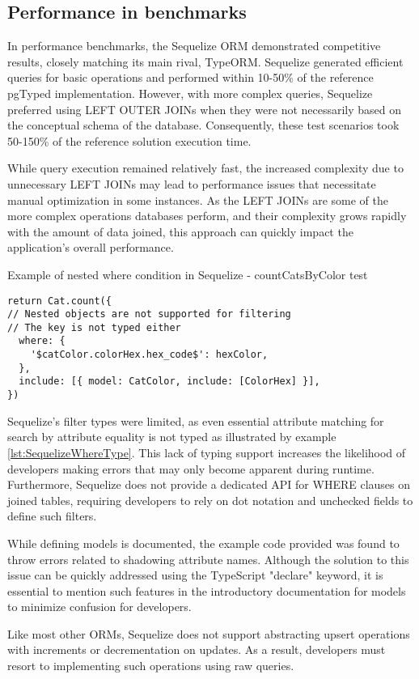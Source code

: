 \subsection*{Performance in benchmarks}

In performance benchmarks, the Sequelize ORM demonstrated competitive results,
closely matching its main rival, TypeORM. Sequelize generated efficient queries
for basic operations and performed within 10-50\% of the reference pgTyped
implementation. However, with more complex queries, Sequelize preferred using
LEFT OUTER JOINs when they were not necessarily based on the conceptual schema
of the database. Consequently, these test scenarios took 50-150\% of the
reference solution execution time.

While query execution remained relatively fast, the increased complexity due to
unnecessary LEFT JOINs may lead to performance issues that necessitate manual
optimization in some instances. As the LEFT JOINs are some of the more complex
operations databases perform, and their complexity grows rapidly with the amount
of data joined, this approach can quickly impact the application's overall
performance.

\begin{listing}
    \caption{Example of nested where condition in Sequelize - countCatsByColor test}
    \label{lst:SequelizeWhereType}
\begin{verbatim}
return Cat.count({
// Nested objects are not supported for filtering
// The key is not typed either
  where: {
    '$catColor.colorHex.hex_code$': hexColor,
  },
  include: [{ model: CatColor, include: [ColorHex] }],
})
    \end{verbatim}
\end{listing}

Sequelize's filter types were limited, as even essential attribute matching for
search by attribute equality is not typed as illustrated by example
\autoref{lst:SequelizeWhereType}. This lack of typing support increases the
likelihood of developers making errors that may only become apparent during
runtime. Furthermore, Sequelize does not provide a dedicated API for WHERE
clauses on joined tables, requiring developers to rely on dot notation and
unchecked fields to define such filters.

While defining models is documented, the example code provided was found to
throw errors related to shadowing attribute names. Although the solution to this
issue can be quickly addressed using the TypeScript "declare" keyword, it is
essential to mention such features in the introductory documentation for models
to minimize confusion for developers.

Like most other ORMs, Sequelize does not support abstracting upsert operations
with increments or decrementation on updates. As a result, developers must
resort to implementing such operations using raw queries.